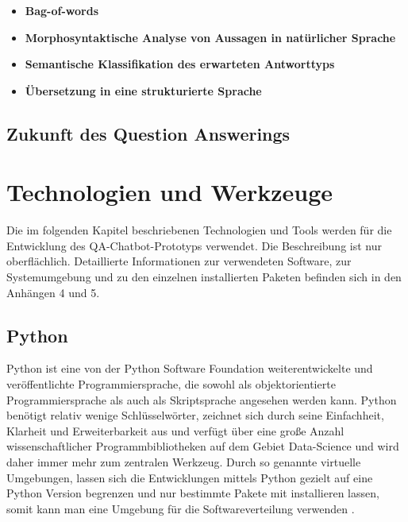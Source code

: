 \documentclass[
        ngerman,
        paper=a4,
        numbers=noendperiod,
]{scrreprt}
\begin{document}
\begin{itemize}
    \item \textbf{Bag-of-words}
    \item \textbf{Morphosyntaktische Analyse von Aussagen in natürlicher Sprache}
    \item \textbf{Semantische Klassifikation des erwarteten Antworttyps}
    \item \textbf{Übersetzung in eine strukturierte Sprache}
\end{itemize}



\section{Zukunft des Question Answerings}



\chapter{Technologien und Werkzeuge}

Die im folgenden Kapitel beschriebenen Technologien und Tools werden für die Entwicklung des QA-Chatbot-Prototyps verwendet. Die Beschreibung ist nur oberflächlich. Detaillierte Informationen zur verwendeten Software, zur Systemumgebung und zu den einzelnen installierten Paketen befinden sich in den Anhängen 4 und 5. %
\section{Python}
Python ist eine von der Python Software Foundation weiterentwickelte und veröffentlichte Programmiersprache, die sowohl als objektorientierte Programmiersprache als auch als Skriptsprache angesehen werden kann. Python benötigt relativ wenige Schlüsselwörter, zeichnet sich durch seine Einfachheit, Klarheit und Erweiterbarkeit aus und verfügt über eine große Anzahl wissenschaftlicher Programmbibliotheken auf dem Gebiet Data-Science und wird daher immer mehr zum zentralen Werkzeug. 
Durch so genannte virtuelle Umgebungen, lassen sich die Entwicklungen mittels Python gezielt auf eine Python Version begrenzen und nur bestimmte Pakete mit installieren lassen, somit kann man eine Umgebung für die Softwareverteilung verwenden \citep[S. 2]{GrotzGrundkurs0.1.2d}.
\end{document}
